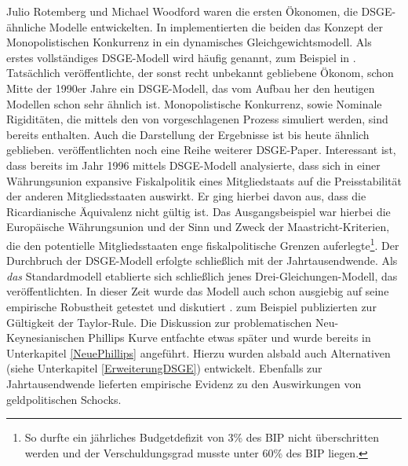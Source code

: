 Julio Rotemberg und Michael Woodford waren die ersten Ökonomen, die DSGE-ähnliche Modelle entwickelten. In \textcite{Rotemberg1993} implementierten die beiden das Konzept der Monopolistischen Konkurrenz in ein dynamisches Gleichgewichtsmodell. Als erstes vollständiges DSGE-Modell wird häufig \textcite{Yun1996} genannt, zum Beispiel in \textcite[S. 80]{Gali2015}. Tatsächlich veröffentlichte, der sonst recht unbekannt gebliebene Ökonom, schon Mitte der 1990er Jahre ein DSGE-Modell, das vom Aufbau her den heutigen Modellen schon sehr ähnlich ist. Monopolistische Konkurrenz, sowie Nominale Rigiditäten, die mittels den von \textcite{Calvo1983} vorgeschlagenen Prozess simuliert werden, sind bereits enthalten. Auch die Darstellung der Ergebnisse ist bis heute ähnlich geblieben. \textcite{Rotemberg1997} veröffentlichten noch eine Reihe weiterer DSGE-Paper. Interessant ist, dass \textcite{Woodford1996} bereits im Jahr 1996 mittels DSGE-Modell analysierte, dass sich in einer Währungsunion expansive Fiskalpolitik eines Mitgliedstaats auf die Preisstabilität der anderen Mitgliedsstaaten auswirkt. Er ging hierbei davon aus, dass die Ricardianische Äquivalenz nicht gültig ist. Das Ausgangsbeispiel war hierbei die Europäische Währungsunion und der Sinn und Zweck der Maastricht-Kriterien, die den potentielle Mitgliedsstaaten enge fiskalpolitische Grenzen auferlegte\footnote{So durfte ein jährliches Budgetdefizit von 3\% des BIP nicht überschritten werden und der Verschuldungsgrad musste unter 60\% des BIP liegen.}. Der Durchbruch der DSGE-Modell erfolgte schließlich mit der Jahrtausendwende. Als \textit{das} Standardmodell etablierte sich schließlich jenes Drei-Gleichungen-Modell, das \textcite{Gali2000} veröffentlichten. In dieser Zeit wurde das Modell auch schon ausgiebig auf seine empirische Robustheit getestet und diskutiert \parencite{Gali1999}. \textcite{Gali1998, Taylor1999} zum Beispiel publizierten zur Gültigkeit der Taylor-Rule. Die Diskussion zur problematischen Neu-Keynesianischen Phillips Kurve entfachte etwas später und wurde bereits in Unterkapitel \ref{NeuePhillips} angeführt. Hierzu wurden alsbald auch Alternativen (siehe Unterkapitel \ref{ErweiterungDSGE}) entwickelt. Ebenfalls zur Jahrtausendwende lieferten \textcite{Rotemberg1998, Christiano1999} empirische Evidenz zu den Auswirkungen von geldpolitischen Schocks.


